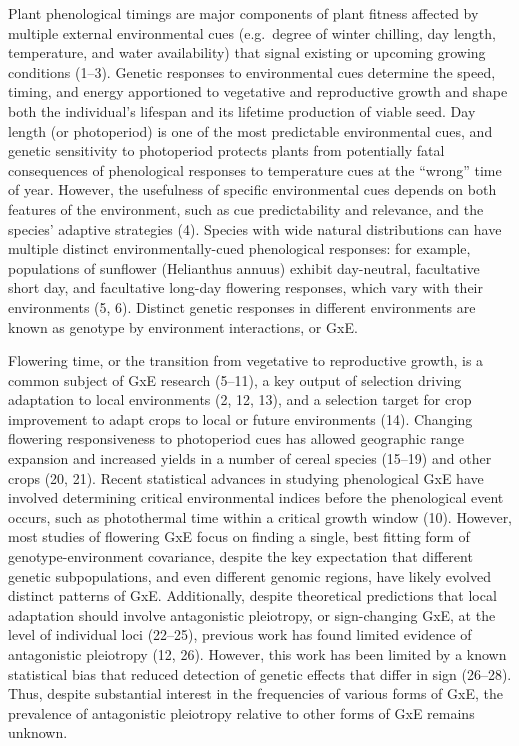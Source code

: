 \documentclass[
  9pt,
  twocolumn,
  twoside]{pnas-new}
\begin{document}
Plant phenological timings are major components of plant fitness
affected by multiple external environmental cues (e.g.~degree of winter
chilling, day length, temperature, and water availability) that signal
existing or upcoming growing conditions (1--3). Genetic responses to
environmental cues determine the speed, timing, and energy apportioned
to vegetative and reproductive growth and shape both the individual's
lifespan and its lifetime production of viable seed. Day length (or
photoperiod) is one of the most predictable environmental cues, and
genetic sensitivity to photoperiod protects plants from potentially
fatal consequences of phenological responses to temperature cues at the
``wrong'' time of year. However, the usefulness of specific
environmental cues depends on both features of the environment, such as
cue predictability and relevance, and the species' adaptive strategies
(4). Species with wide natural distributions can have multiple distinct
environmentally-cued phenological responses: for example, populations of
sunflower (Helianthus annuus) exhibit day-neutral, facultative short
day, and facultative long-day flowering responses, which vary with their
environments (5, 6). Distinct genetic responses in different
environments are known as genotype by environment interactions, or GxE.

Flowering time, or the transition from vegetative to reproductive
growth, is a common subject of GxE research (5--11), a key output of
selection driving adaptation to local environments (2, 12, 13), and a
selection target for crop improvement to adapt crops to local or future
environments (14). Changing flowering responsiveness to photoperiod cues
has allowed geographic range expansion and increased yields in a number
of cereal species (15--19) and other crops (20, 21). Recent statistical
advances in studying phenological GxE have involved determining critical
environmental indices before the phenological event occurs, such as
photothermal time within a critical growth window (10). However, most
studies of flowering GxE focus on finding a single, best fitting form of
genotype-environment covariance, despite the key expectation that
different genetic subpopulations, and even different genomic regions,
have likely evolved distinct patterns of GxE. Additionally, despite
theoretical predictions that local adaptation should involve
antagonistic pleiotropy, or sign-changing GxE, at the level of
individual loci (22--25), previous work has found limited evidence of
antagonistic pleiotropy (12, 26). However, this work has been limited by
a known statistical bias that reduced detection of genetic effects that
differ in sign (26--28). Thus, despite substantial interest in the
frequencies of various forms of GxE, the prevalence of antagonistic
pleiotropy relative to other forms of GxE remains unknown.
\end{document}
